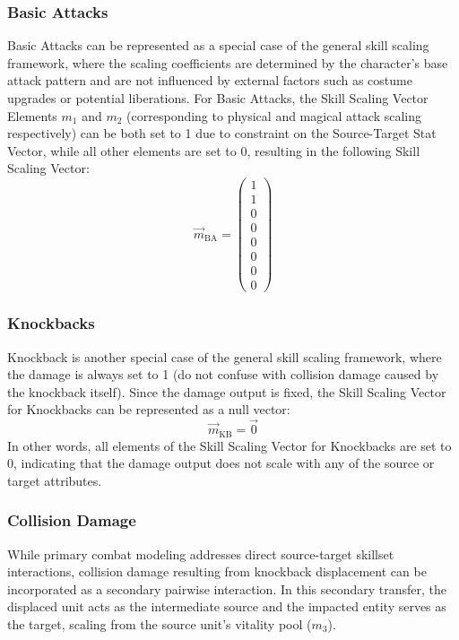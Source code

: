\documentclass[twocolumn,10pt]{article}
\begin{document}
\subsubsection{Basic Attacks}
Basic Attacks can be represented as a special case of the general skill scaling framework, where the scaling coefficients are determined by the character's base attack pattern and are not influenced by external factors such as costume upgrades or potential liberations. For Basic Attacks, the Skill Scaling Vector Elements $m_1$ and $m_2$ (corresponding to physical and magical attack scaling respectively) can be both set to 1 due to constraint on the Source-Target Stat Vector, while all other elements are set to 0, resulting in the following Skill Scaling Vector:
\begin{equation}
  \vec{m}_{\text{BA}} = \begin{pmatrix} 
  1 \\ 
  1 \\ 
  0 \\ 
  0 \\ 
  0 \\ 
  0 \\ 
  0 \\
  0
  \end{pmatrix}
\end{equation}

\subsubsection{Knockbacks}
Knockback is another special case of the general skill scaling framework, where the damage is always set to 1 (do not confuse with collision damage caused by the knockback itself). Since the damage output is fixed, the Skill Scaling Vector for Knockbacks can be represented as a null vector:
\begin{equation}
  \vec{m}_{\text{KB}} = \vec{0}
\end{equation}
In other words, all elements of the Skill Scaling Vector for Knockbacks are set to 0, indicating that the damage output does not scale with any of the source or target attributes.

\subsubsection{Collision Damage}
While primary combat modeling addresses direct source-target skillset interactions, collision damage resulting from knockback displacement can be incorporated as a secondary pairwise interaction. In this secondary transfer, the displaced unit acts as the intermediate source and the impacted entity serves as the target, scaling from the source unit's vitality pool ($m_3$).
\end{document}
